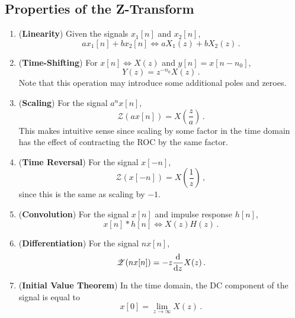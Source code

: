 \subsection{Properties of the Z-Transform}
%
\begin{enumerate}
\item (\textbf{Linearity}) Given the signals $x_1[n]$ and $x_2[n]$,
  \begin{displaymath}
    ax_1[n] + bx_2[n] \Longleftrightarrow aX_1(z) + bX_2(z) \,. 
  \end{displaymath}
\item (\textbf{Time-Shifting}) For $x[n] \Longleftrightarrow X(z)$ and
  $y[n] = x[n-n_0]$,
  \begin{displaymath}
    Y(z) = z^{-n_0}X(z) \,.
  \end{displaymath}
  Note that this operation may introduce some additional poles and zeroes.
\item (\textbf{Scaling}) For the signal $a^n x[n]$,
  \begin{displaymath}
    \mathscr{Z}(a x[n]) = X\left(\frac{z}{a}\right) \,.
  \end{displaymath}
  This makes intuitive sense since scaling by some factor in the time domain
  has the effect of contracting the ROC by the same factor.
\item (\textbf{Time Reversal}) For the signal $x[-n]$,
  \begin{displaymath}
    \mathscr{Z}(x[-n]) = X\left(\frac{1}{z}\right) \,,
  \end{displaymath}
  since this is the same as scaling by $-1$.
\item (\textbf{Convolution}) For the signal $x[n]$ and impulse response $h[n]$,
  \begin{displaymath}
    x[n] * h[n] \Longleftrightarrow X(z)H(z) \,.
  \end{displaymath}
\item (\textbf{Differentiation}) For the signal $nx[n]$,
  \begin{displaymath}
    \mathscr{Z}(nx[n]) = -z\frac{\mathrm{d}\mkern1mu}{\mathrm{d}z\mkern1mu}X(z) \,.
  \end{displaymath}
\item (\textbf{Initial Value Theorem}) In the time domain, the DC component of
  the signal is equal to
  \begin{displaymath}
    x[0] = \lim_{z\rightarrow\infty}X(z) \,.
  \end{displaymath}
\end{enumerate}
